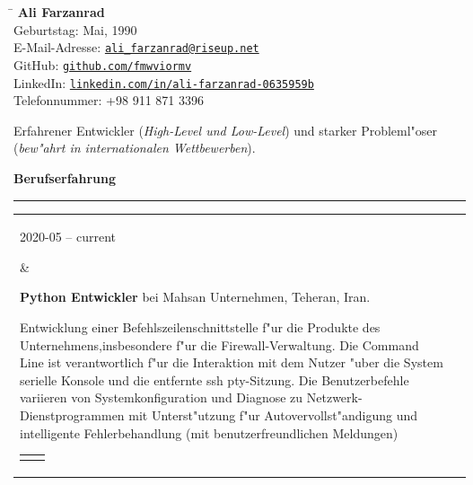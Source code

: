 \documentclass[11pt,a4paper,oneside]{article}
\makeatletter
\newcommand{\https}[1]{\href{https://#1}{\nolinkurl{#1}}}
\newcommand{\mailto}[1]{\href{mailto://#1}{\nolinkurl{#1}}}
\newcommand{\prog}{Programmiersprache:}
\newcommand{\os}{Betriebssystem:}
\newcommand{\vcs}{Versionskontrollen:}
\newcommand{\issue}{Problemverfolgung:}
\renewcommand{\section}[1]{%
{\large\textbf{#1}}\\
\rule[9pt]{18cm}{.4pt}\vspace{-16pt}%
}
\newenvironment{mytable}{%
\begin{tabular}{@{}l@{\hspace{4mm}}l@{}}%
}{\end{tabular}}
\newcommand{\myitem}[2]{%
\parbox[t]{16mm}{#1}&\parbox[t]{16cm}{#2}\\%
}
\newenvironment{innertable}{%
\begin{tabular}{@{}l@{\hspace{5mm}}l@{}}%
}{\end{tabular}}
\newcommand{\inneritem}[2]{%
\parbox{35mm}{{\color{darkgray}#1}}&\parbox{12cm}{#2}\\%
}
\makeatother
\begin{document}
%
%
\hspace{1cm}%
\parbox{13cm}{%
\begin{tabbing}%
\hspace{3cm}\=\kill%
\textbf{{\LARGE Ali Farzanrad}}\\[5mm]
Geburtstag:  Mai, 1990\\[1mm]
E-Mail-Adresse: \>
\mailto{ali_farzanrad@riseup.net}\\[1mm]
GitHub: \>
\https{github.com/fmwviormv}\\[1mm]
LinkedIn: \>
\https{linkedin.com/in/ali-farzanrad-0635959b}\\[1mm]
Telefonnummer: \>
{+}98{ }911{ }871{ }3396\\
\end{tabbing}%
}

\vspace{-9pt}%
Erfahrener Entwickler (\textit{High-Level und Low-Level}) und starker
Probleml"oser (\textit{bew"ahrt in internationalen Wettbewerben}).

\section{Berufserfahrung}

\begin{mytable}
\myitem{2020-05 -- current}{%
\textbf{Python Entwickler} bei
Mahsan Unternehmen, Teheran, Iran.

Entwicklung einer Befehlszeilenschnittstelle f"ur die Produkte
des Unternehmens,insbesondere f"ur die Firewall-Verwaltung.
Die Command Line ist verantwortlich f"ur die Interaktion mit dem Nutzer
"uber die System serielle Konsole und die entfernte ssh pty-Sitzung.
Die Benutzerbefehle variieren von Systemkonfiguration und Diagnose
zu Netzwerk-Dienstprogrammen mit Unterst"utzung
f"ur Autovervollst"andigung und intelligente Fehlerbehandlung
(mit benutzerfreundlichen Meldungen)

\begin{innertable}
\inneritem{\prog}{Python 3}
\inneritem{\os}{Ubuntu}
\inneritem{\vcs}{Git}
\inneritem{\issue}{Gitlab}
\end{innertable}
}
\end{mytable}
\end{document}
